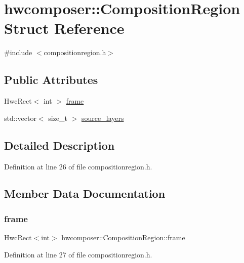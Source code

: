 \hypertarget{structhwcomposer_1_1CompositionRegion}{}\section{hwcomposer\+:\+:Composition\+Region Struct Reference}
\label{structhwcomposer_1_1CompositionRegion}


{\ttfamily \#include $<$compositionregion.\+h$>$}

\subsection*{Public Attributes}
\begin{DoxyCompactItemize}
\item 
Hwc\+Rect$<$ int $>$ \mbox{\hyperlink{structhwcomposer_1_1CompositionRegion_a0dc5ac6f3fca1fb7c8564d18a58316e8}{frame}}
\item 
std\+::vector$<$ size\+\_\+t $>$ \mbox{\hyperlink{structhwcomposer_1_1CompositionRegion_a4cb8206ae9aa2ffd872d3cb5fda6d39e}{source\+\_\+layers}}
\end{DoxyCompactItemize}


\subsection{Detailed Description}


Definition at line 26 of file compositionregion.\+h.



\subsection{Member Data Documentation}
\mbox{\label{structhwcomposer_1_1CompositionRegion_a0dc5ac6f3fca1fb7c8564d18a58316e8}} 
\subsubsection{\texorpdfstring{frame}{frame}}
{\footnotesize\ttfamily Hwc\+Rect$<$int$>$ hwcomposer\+::\+Composition\+Region\+::frame}



Definition at line 27 of file compositionregion.\+h.

